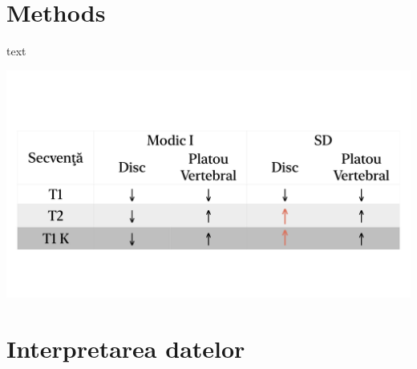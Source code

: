 \documentclass[romanian,12pt,a4paper]{article}
\begin{document}
\section{Methods}
text
\begin{table}
	\includegraphics[width=\textwidth]{Files/tb-DSI_vs_MODIC.png}
	
\end{table}

\pagebreak
\section{Interpretarea datelor}
\pagebreak
\printbibliography[title={Bibliografie}]
\end{document}
